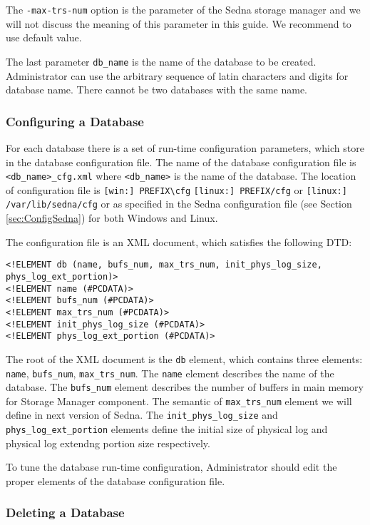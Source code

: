\documentclass[a4paper,12pt]{article}
\begin{document}
The \verb!-max-trs-num! option is the parameter of the Sedna storage manager and we will not discuss the meaning of this parameter in this guide. We recommend to use default value.

The last parameter \verb!db_name! is the name of the database to be created. Administrator can use the arbitrary sequence of latin characters and digits for database name. There  cannot be two databases with the same name.

\subsubsection{Configuring a Database}
\label{ConfigDB}
For each database there is a set of run-time configuration parameters, which store in the database configuration file. The name of the database configuration file is \verb!<db_name>_cfg.xml! where \verb!<db_name>! is the name of the database. The location of configuration file is \verb![win:] PREFIX\cfg! \verb![linux:] PREFIX/cfg! or \verb![linux:] /var/lib/sedna/cfg! or as specified in the Sedna configuration file (see Section \ref{sec:ConfigSedna}) for both Windows and Linux. 

The configuration file is an XML document, which satisfies the following DTD: 

\begin{verbatim}
<!ELEMENT db (name, bufs_num, max_trs_num, init_phys_log_size, phys_log_ext_portion)>
<!ELEMENT name (#PCDATA)>
<!ELEMENT bufs_num (#PCDATA)>
<!ELEMENT max_trs_num (#PCDATA)>
<!ELEMENT init_phys_log_size (#PCDATA)>
<!ELEMENT phys_log_ext_portion (#PCDATA)>
\end{verbatim}

The root of the XML document is the \verb!db! element, which contains three elements: \verb!name!, \verb!bufs_num!, \verb!max_trs_num!. The \verb!name! element describes the name of the database. The \verb!bufs_num! element describes the number of buffers in main memory for Storage Manager component. The semantic of \verb!max_trs_num! element we will define in next version of Sedna. The \verb!init_phys_log_size! and \verb!phys_log_ext_portion! elements define the initial size of physical log and physical log extendng portion size respectively.

To tune the database run-time configuration, Administrator should edit the proper elements of the database configuration file.

\subsubsection{Deleting a Database}
\end{document}
